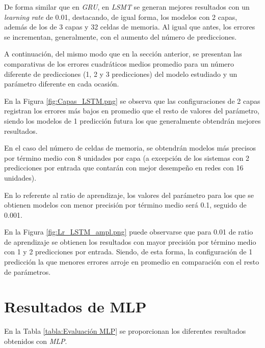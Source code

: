 De forma similar que en \textit{GRU}, en \textit{LSMT} se generan mejores resultados con un 
\textit{learning rate} de 0.01, destacando, de igual forma, los modelos con 2 capas, además
de los de 3 capas y 32 celdas de memoria.
Al igual que antes, los errores se incrementan, generalmente, con el aumento del número de predicciones.

A continuación, del mismo modo que en la sección anterior, se presentan las comparativas de los errores 
cuadráticos medios promedio para un número diferente de predicciones (1, 2 y 3 predicciones) del modelo estudiado y un parámetro diferente en cada ocasión.

En la Figura \ref{fig:Capas_LSTM.png} se observa que las configuraciones de 2 capas registran los 
errores más bajos en promedio que el resto de valores del parámetro, siendo los modelos de 1 predicción
futura los que generalmente obtendrán mejores resultados.

En el caso del número de celdas de memoria, se obtendrán modelos más precisos por término medio con 8 
unidades por capa (a excepción de los sistemas con 2 predicciones por entrada que contarán con mejor 
desempeño en redes con 16 unidades). 

En lo referente al ratio de aprendizaje, los valores del parámetro para los que se obtienen modelos
con menor precisión por término medio será 0.1, seguido de 0.001.

En la Figura \ref{fig:Lr_LSTM_ampl.png} puede observarse que para 0.01 de ratio de aprendizaje se obtienen
los resultados con mayor precisión por término medio con 1 y 2 predicciones por entrada. Siendo, de esta 
forma, la configuración de 1 predicción la que menores errores arroje en promedio en comparación con el 
resto de parámetros.

\newpage

\section{Resultados de MLP}
En la Tabla \ref{tabla:Evaluación MLP} se proporcionan los diferentes resultados obtenidos con \textit{MLP}.


